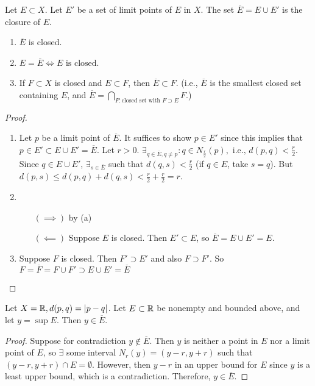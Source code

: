\begin{definition}[Closure]
	Let $E \subset X$. Let $E'$ be a set of limit points of $E$ in $X$.
	The set $\overline{E}=E \cup E'$ is the closure of $E$.
\end{definition}
\begin{thm}[27]
	\label{thm:closure}
	\hfill
	\begin{enumerate}
		\item  $\overline{E}$ is closed.
		\item $E=\overline{E} \Leftrightarrow   \text{$E$ is closed}$.
		\item If $F \subset X$ is closed and $E \subset  F$, then $\overline{E} \subset F$. (i.e., $\overline{E}$ is the smallest closed set containing $E$, and $\overline{E}= \bigcap_{F:\text{closed set with $F \supset E$}} F$.)
	\end{enumerate}
	\begin{proof}
		\begin{enumerate}
			\item Let $p$ be a limit point of $\overline{E}$. It suffices to show $p \in E'$ since this implies that $p \in E' \subset E \cup E'=\overline{E}$.
			      Let $r>0$. $\exists_{q\in \overline{E}, q\neq p}: q \in N_{\frac{r}{2}}(p), \text{ i.e., } d(p,q) < \frac{r}{2}$. Since $q \in E \cup E'$, $\exists_{s \in \overline{E}}$ such that $d(q,s)<\frac{r}{2}$ (if $q \in E$, take $s=q$).
			      But $d(p,s) \le d(p,q)+d(q,s)<\frac{r}{2}+\frac{r}{2}=r$.
			\item
			      \begin{itemize}
				      \item[$(\implies)$] by (a)
				      \item[$(\impliedby)$] Suppose $E$ is closed. Then $E' \subset E$, so $\overline{E}=E \cup E'=E$.
			      \end{itemize}
			\item Suppose $F$ is closed. Then $F' \supset E'$ and also $F \supset F'$. So $F=\overline{F}=F \cup F' \supset E \cup E'=\overline{E}$
		\end{enumerate}

	\end{proof}
\end{thm}

\begin{example}
	Let $X=\mathbb{R} , d(p,q)=|p-q|$. Let $E \subset \mathbb{R} $ be nonempty and bounded above, and let $y=\sup E$. Then $y \in \overline{E}$.
	\begin{proof}
		Suppose for contradiction $y \not\in \overline{E}$. Then $y$ is neither a point in $E$ nor a limit point of $E$, so $\exists$ some interval $N_r(y)=(y-r,y+r)$ such that $(y-r,y+r) \cap  E=\emptyset $. However, then $y-r$ in an upper bound for $E$ since $y$ is a least upper bound, which is a contradiction. Therefore, $y \in \overline{E}$.
	\end{proof}
\end{example}

